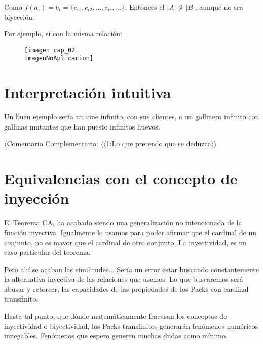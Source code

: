 Como $f(a_{i}) = b_{i} = \{c_{i1}, c_{i2}, ... , c_{ir}, ... \}$. Entonces el $|A| \ngtr |B|$, aunque no sea biyección.

Por ejemplo, si con la misma relación:
\begin{figure}[h]
	\texttt{[image: cap\_02\\ImagenNoAplicacion]}
	\centering
\end{figure}










\newpage
\section{Interpretación intuitiva}
Un buen ejemplo sería un cine infinito, con sus clientes, o un gallinero infinito con gallinas mutantes que han puesto infinitos huevos.

$\langle$Comentario Complementario: $\langle\langle$1:Lo que pretendo que se deduzca$\rangle\rangle$

\newpage
\section{Equivalencias con el concepto de inyección}

El Teorema CA, ha acabado siendo una generalización no intencionada de la función inyectiva. Igualmente lo usamos para poder afirmar que el cardinal de un conjunto, no es mayor que el cardinal de otro conjunto. La inyectividad, es un caso particular del teorema.

Pero ahí se acaban las similitudes... Sería un error estar buscando constantemente la alternativa inyectiva de las relaciones que usemos. Lo que buscaremos será abusar y retorcer, las capacidades de las propiedades de los Packs con cardinal transfinito.

Hasta tal punto, que dónde matemáticamente fracasan los conceptos de inyectividad o biyectividad, los Packs transfinitos generarán fenómenos numéricos innegables. Fenómenos que espero generen muchas dudas como mínimo.